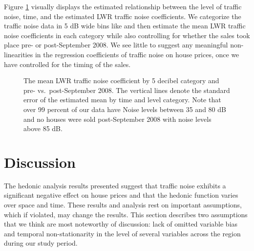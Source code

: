 \documentclass{article}\usepackage[]{graphicx}\usepackage[]{color}
\begin{document}
Figure \ref{fig:betaMAXvCat} visually displays the estimated relationship between the level of traffic noise, time, and the estimated LWR traffic noise coefficients. We categorize the traffic noise data in 5 dB wide bins like \citet{Theebe2004a} and then estimate the mean LWR traffic noise coefficients in each category while also controlling for whether the sales took place pre- or post-September 2008. We see little to suggest any meaningful non-linearities in the regression coefficients of traffic noise on house prices, once we have controlled for the timing of the sales.

\begin{figure}
\caption{The mean LWR traffic noise coefficient by 5 decibel category and pre- vs.\ post-September 2008. The vertical lines denote the standard error of the estimated mean by time and level category. Note that over 99 percent of our data have Noise levels between 35 and 80 dB and no houses were sold post-September 2008 with noise levels above 85 dB.}\label{fig:betaMAXvCat}
\end{figure}


\section{Discussion}\label{Discussion}

The hedonic analysis results presented suggest that traffic noise exhibits a significant negative effect on house prices and that the hedonic function varies over space and time. These results and analysis rest on important assumptions, which if violated, may change the results. This section describes two assumptions that we think are most noteworthy of discussion: lack of omitted variable bias and temporal non-stationarity in the level of several variables across the region during our study period.
\end{document}
